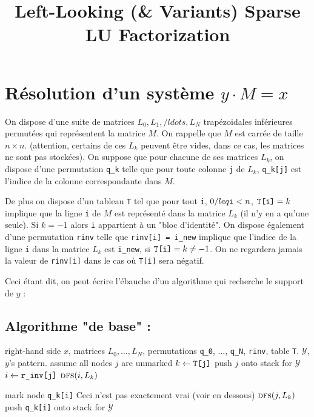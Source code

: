 \documentclass{article}
\begin{document}
\title{ Left-Looking (\& Variants) Sparse LU Factorization}
\maketitle


\section{Résolution d'un système $y \cdot M = x$}
On dispose d'une suite de matrices $L_0, L_1, /ldots, L_N$ trapézoidales inférieures permutées qui représentent la matrice $M$. On rappelle que $M$ est carrée de taille $n \times n$. (attention, certains de ces $L_k$ peuvent être vides, dans ce cas, les matrices ne sont pas stockées). On suppose que pour chacune de ses matrices $L_k$, on dispose d'une permutation \verb$q_k$ telle que pour toute colonne \verb$j$ de $L_k$, \verb$q_k[j]$ est l'indice de la colonne correspondante dans $M$.

De plus on dispose d'un tableau \verb$T$ tel que pour tout \verb$i$, $0 /leq \verb|i| < n$, $\verb|T[i]| = k$ implique que la ligne \verb$i$ de $M$ est représenté dans la matrice $L_k$ (il n'y en a qu'une seule). Si $k = -1$ alors \verb$i$ appartient à un "bloc d'identité". On dispose également d'une permutation \verb$rinv$ telle que \verb$rinv[i] = i_new$ implique que l'indice de la ligne \verb$i$ dans la matrice $L_k$ est \verb$i_new$, si $\verb|T[i]| = k \not= -1$. On ne regardera jamais la valeur de \verb$rinv[i]$ dans le cas où \verb$T[i]$ sera négatif.

Ceci étant dit, on peut écrire l'ébauche d'un algorithme qui recherche le support de $y$ :

\subsection{Algorithme "de base" :}

\begin{algorithmic}
\Require right-hand side $x$, matrices $L_0, \ldots, L_N$, permutations \verb$q_0$, ..., \verb$q_N$, \verb$rinv$, table \verb$T$.
\Ensure $\mathcal{Y}$, $y$'s pattern.
\State assume all nodes $j$ are unmarked
\State $k \gets \verb|T[j]|$
\State push $j$ onto stack for $\mathcal{Y}$
\Else
\State $i \gets \verb|r_inv[j]|$
\State $\textsc{dfs}(i, L_k)$
\EndIf
\EndIf
\EndFor   
\end{algorithmic}   

\begin{algorithmic}
\State mark node \verb$q_k[i]$ \Comment Ceci n'est pas exactement vrai (voir en dessous)
\State $\textsc{dfs}(j, L_k)$
\EndIf
\State push \verb$q_k[i]$ onto stack for $\mathcal{Y}$
\EndFor
\EndProcedure
\end{algorithmic}
\end{document}
